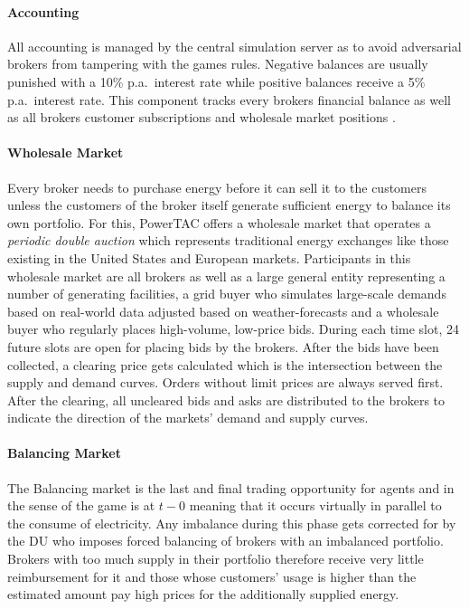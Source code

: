\paragraph{Accounting} All accounting is managed by the central simulation server as to avoid adversarial brokers
from tampering with the games rules. Negative balances are usually punished with a 10\% p.a.\ interest rate while
positive balances receive a 5\% p.a.\ interest rate. This component tracks every brokers financial balance as well as
all brokers customer subscriptions and wholesale market positions \citep[p.11]{ketter2018powertac}.

\paragraph{Wholesale Market}
Every broker needs to purchase energy before it can sell it to the customers unless the customers of the broker itself
generate sufficient energy to balance its own portfolio. For this, \ac{PowerTAC} offers a wholesale market that operates
a \emph{periodic double auction} which represents traditional energy exchanges like those existing in the United States
and European markets. Participants in this wholesale market are all brokers as well as a large general entity
representing a number of generating facilities, a grid buyer who simulates large-scale demands based on real-world data
adjusted based on weather-forecasts and a wholesale buyer who regularly places high-volume, low-price bids. During each
time slot, 24 future slots are open for placing bids by the brokers. After the bids have been collected, a clearing
price gets calculated which is the intersection between the supply and demand curves. Orders without limit prices are
always served first. After the clearing, all uncleared bids and asks are distributed to the brokers to indicate the
direction of the markets' demand and supply curves.

\paragraph{Balancing Market} The Balancing market is the last and final trading opportunity for agents and in the
sense of the game is at $t-0$ meaning that it occurs virtually in parallel to the consume of electricity. Any imbalance
during this phase gets corrected for by the \ac{DU} who imposes forced balancing of brokers with an imbalanced
portfolio. Brokers with too much supply in their portfolio therefore receive very little reimbursement for it and those
whose customers' usage is higher than the estimated amount pay high prices for the additionally supplied energy.

